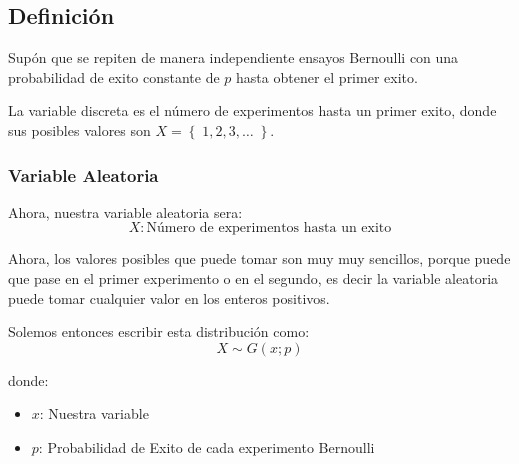 \documentclass[12pt, fleqn]{report}                             %
\theoremstyle{break}                                            %
\newcommand{\Set}[1]            {\left\{ \; #1 \; \right\}}     %
\begin{document}
            \subsection{Definición}

                Supón que se repiten de manera independiente ensayos Bernoulli
                con una probabilidad de exito constante de $p$ hasta obtener el primer
                exito.

                La variable discreta es el número de experimentos hasta un primer exito,
                donde sus posibles valores son $X = \Set{1, 2, 3, \dots}$.


                \vspace{1em}
                \subsubsection{Variable Aleatoria}

                    Ahora, nuestra variable aleatoria sera:
                    \begin{equation*}
                        X : \text{Número de experimentos hasta un exito}
                    \end{equation*}

                    Ahora, los valores posibles que puede tomar son muy muy sencillos,
                    porque puede que pase en el primer experimento o en el segundo, 
                    es decir la variable aleatoria puede tomar cualquier valor en los enteros
                    positivos.

                    Solemos entonces escribir esta distribución como:
                    \begin{equation*}
                        X \sim G(x; p)
                    \end{equation*}

                    donde:
                    \begin{itemize}
                        \item $x$: Nuestra variable
                        \item $p$: Probabilidad de Exito de cada experimento Bernoulli
                    \end{itemize}
\end{document}
